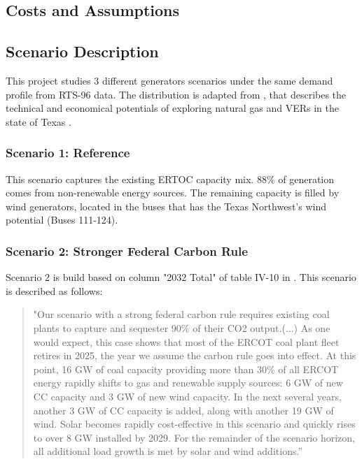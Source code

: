 \documentclass[12pt,LUDisStyle,twosided]{book}
\begin{document}
\subsection{Costs and Assumptions}


\subsection{Scenario Description}

This project studies 3 different generators scenarios under the same demand profile from RTS-96 data. The distribution is adapted from \citeauthor{shavel}, that describes the technical and economical potentials of exploring natural gas and VERs in the state of Texas \cite{shavel}. 

\subsubsection{Scenario 1: Reference}

This scenario captures the existing ERTOC capacity mix. 88\% of generation comes from non-renewable energy sources. The remaining capacity is filled by wind generators, located in the buses that has the Texas Northwest's wind potential (Buses 111-124).

\subsubsection{Scenario 2: Stronger Federal Carbon Rule}

Scenario 2 is build based on column "2032 Total" of table IV-10 in \cite{shavel}. This scenario is described as follows:

\begin{quotation}
"Our scenario with a strong federal carbon rule requires existing coal plants to capture and sequester 90\% of their CO2 output.(...)
As one would expect, this case shows that most of the ERCOT coal plant fleet retires in 2025, the year we assume the carbon rule goes into effect. At this point, 16 GW of coal capacity providing more than 30\% of all ERCOT energy rapidly shifts to gas and renewable supply sources: 6 GW of new CC capacity and 3 GW of new wind capacity. In the next several years, another 3 GW of CC capacity is added, along with another 19 GW of wind. Solar becomes rapidly cost-effective in this scenario and quickly rises to over 8 GW installed by 2029. For the remainder of the scenario horizon, all additional load growth is met by solar and wind additions.”
\end{quotation}
\end{document}
